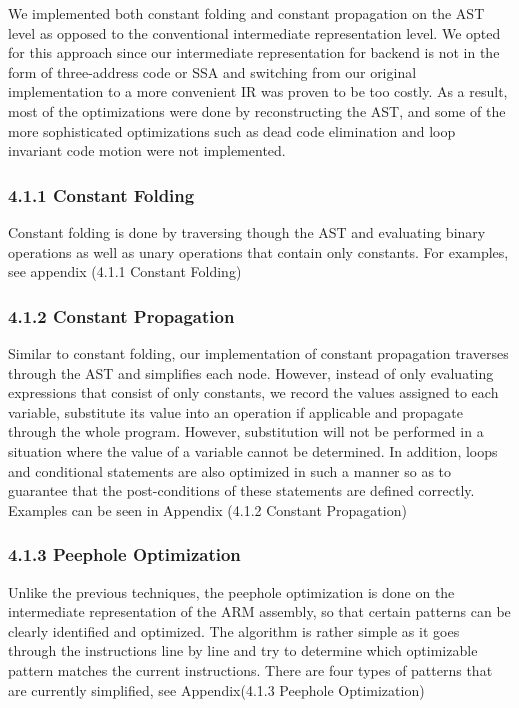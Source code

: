 \documentclass[10pt,a4paper]{report}
\begin{document}
  We implemented both constant folding and constant propagation on the AST level
  as opposed to the conventional intermediate representation level. We opted for
  this approach since our intermediate representation for backend is not in the
  form of three-address code or SSA and switching from our original
  implementation to a more convenient IR was proven to be too costly. As a
  result, most of the optimizations were done by reconstructing the AST, and
  some of the more sophisticated optimizations such as dead code elimination and
  loop invariant code motion were not implemented.

  \subsubsection*{4.1.1 Constant Folding}
  Constant folding is done by traversing though the AST and evaluating binary
  operations as well as unary operations that contain only constants. For
  examples, see appendix (4.1.1 Constant Folding)

  \subsubsection*{4.1.2 Constant Propagation}
  Similar to constant folding, our implementation of constant propagation
  traverses through the AST and simplifies each node. However, instead of only
  evaluating expressions that consist of only constants, we record the values
  assigned to each variable, substitute its value into an operation if
  applicable and propagate through the whole program. However, substitution will
  not be performed in a situation where the value of a variable cannot be
  determined. In addition, loops and conditional statements are also optimized
  in such a manner so as to guarantee that the post-conditions of these
  statements are defined correctly. Examples can be seen in Appendix (4.1.2
  Constant Propagation)

  \subsubsection*{4.1.3 Peephole Optimization}
  Unlike the previous techniques, the peephole optimization is done on the
  intermediate representation of the ARM assembly, so that certain patterns can
  be clearly identified and optimized. The algorithm is rather simple as it goes
  through the instructions line by line and try to determine which optimizable
  pattern matches the current instructions. There are four types of patterns
  that are currently simplified, see Appendix(4.1.3 Peephole Optimization)
\end{document}
